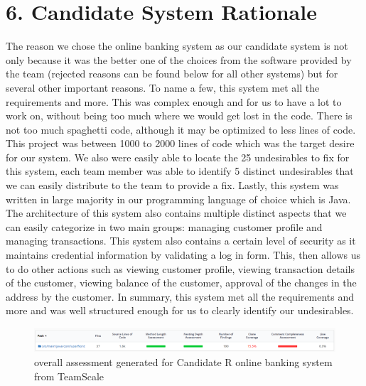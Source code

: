 \documentclass[letterpaper, 11pt]{report}
\begin{document}
\section*{6. Candidate System Rationale}
\normalsize{The reason we chose the online banking system as our candidate system is not only because it was the better one of the choices from the software provided by the team (rejected reasons can be found below for all other systems) but for several other important reasons. To name a few, this system met all the requirements and more. This was complex enough and for us to have a lot to work on, without being too much where we would get lost in the code. There is not too much spaghetti code, although it may be optimized to less lines of code. This project was between 1000 to 2000 lines of code which was the target desire for our system. We also were easily able to locate the 25 undesirables to fix for this system, each team member was able to identify 5 distinct undesirables that we can easily distribute to the team to provide a fix. Lastly, this system was written in large majority in our programming language of choice which is Java. The architecture of this system also contains multiple distinct aspects that we can easily categorize in two main groups: managing customer profile and managing transactions. This system also contains a certain level of security as it maintains credential information by validating a log in form. This, then allows us to do other actions such as viewing customer proﬁle, viewing transaction details of the customer, viewing balance of the customer, approval of the changes in the address by the customer. In summary, this system met all the requirements and more and was well structured enough for us to clearly identify our undesirables.}\\
\begin{figure}[htb]
\begin{center}
\includegraphics[width=13cm]{D1-Reengineering Opportunity/images/Picture6.png}
\caption{overall assessment generated for Candidate R online banking system from TeamScale}
\end{center}
\end{figure}
\end{document}
